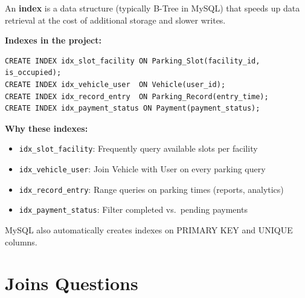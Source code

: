 \documentclass[12pt,a4paper]{article}
\begin{document}
\begin{questionbox}
\end{questionbox}
\begin{answerbox}
An \textbf{index} is a data structure (typically B-Tree in MySQL) that speeds up data retrieval at the cost of additional storage and slower writes.

\textbf{Indexes in the project:}
\begin{lstlisting}
CREATE INDEX idx_slot_facility ON Parking_Slot(facility_id, is_occupied);
CREATE INDEX idx_vehicle_user  ON Vehicle(user_id);
CREATE INDEX idx_record_entry  ON Parking_Record(entry_time);
CREATE INDEX idx_payment_status ON Payment(payment_status);
\end{lstlisting}

\textbf{Why these indexes:}
\begin{itemize}[nosep]
    \item \texttt{idx\_slot\_facility}: Frequently query available slots per facility
    \item \texttt{idx\_vehicle\_user}: Join Vehicle with User on every parking query
    \item \texttt{idx\_record\_entry}: Range queries on parking times (reports, analytics)
    \item \texttt{idx\_payment\_status}: Filter completed vs.\ pending payments
\end{itemize}

MySQL also automatically creates indexes on PRIMARY KEY and UNIQUE columns.
\end{answerbox}

\section{Joins Questions}
\end{document}
